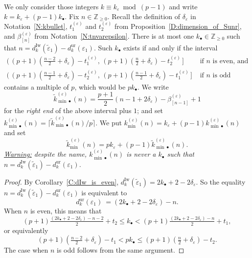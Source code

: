 \begin{lemmanotation}
    \label{L:extremal_ks_part3}
    We only consider those integers $k \equiv k_\varepsilon \bmod{(p-1)}$ and write $k=k_\varepsilon+(p-1)k_{\bullet}$. Fix $n\in {\mathbb{Z}}_{ \geq 0}$.
    Recall the definition of $\delta_\varepsilon$ in Notation~\ref{N:kbullet}, $t_1^{(\varepsilon)}$ and $t_2^{(\varepsilon)}$ from Proposition~\ref{D:dimension_of_Sunr}, and $\beta_{[n]}^{(\varepsilon)}$ from Notation~\ref{N:tnvarepsilon}.
    There is at most one $k_\bullet \in {\mathbb{Z}}_{\geq 0}$ such that  $n = d_{k}^{\mathrm{Iw}}(\tilde \varepsilon_1)-d_{k}^{\mathrm{ur}}(\varepsilon_1)$.
    Such $k_\bullet$ exists if and only if the interval
    \begin{align}
    \label{E:condition_on_kmin}
    \big(\,(p+1)( \tfrac {n-2}2 + \delta_\varepsilon)  -t_1^{(\varepsilon)} , \, (p+1)( \tfrac n2 + \delta_\varepsilon)  -t_2^{(\varepsilon)}\, \big]& \textrm{ if }n \textrm{ is even, and}
    \\
    \nonumber \big(\,(p+1)( \tfrac {n-1}2 + \delta_\varepsilon)  -t_2^{(\varepsilon)} , \, (p+1)( \tfrac {n-1}2 + \delta_\varepsilon)  -t_1^{(\varepsilon)}\, \big] &\textrm{ if }n \textrm{ is odd}
    \end{align}
    contains a multiple of $p$, which would be $pk_\bullet$. We write $$\tilde k_{{\min}\bullet}^{(\varepsilon)}(n)= \frac{p+1}2(n-1+2\delta_\varepsilon) - \beta_{[n-1]}^{(\varepsilon)}+1$$ for the \emph{right end} of the above interval plus $1$; and set $k_{{\min}\bullet}^{(\varepsilon)}(n) = \lceil \tilde k_{{\min}\bullet}^{(\varepsilon)} (n)/ p\rceil$.
    We put $k_{\min}^{(\varepsilon)}(n) = k_\varepsilon + (p-1)k_{{\min}\bullet}^{(\varepsilon)}(n)$ and set
    $$\tilde k_{{\min}}^{(\varepsilon)}(n)  = pk_\varepsilon + (p-1)\tilde k_{{\min}\bullet}^{(\varepsilon)}(n).
    $$
    \emph{\underline{Warning:} despite the name, $k_{{\min}\bullet}^{(\varepsilon)}(n)$ is never  a $k_\bullet$ such that $n = d_{k}^{\mathrm{Iw}}(\tilde \varepsilon_1) - d_{k}^{\mathrm{ur}}(\varepsilon_1)$.}
\end{lemmanotation}

\begin{proof}
    By Corollary~\ref{C:dIw_is_even}, $d_{k}^{{\mathrm{Iw}}}(\tilde \varepsilon_1) = 2k_\bullet + 2-2\delta_\varepsilon$. So the equality $n = d_{k}^{\mathrm{Iw}}(\tilde \varepsilon_1)-d_{k}^{\mathrm{ur}}(\varepsilon_1)$ is equivalent to
    $$
    d_{k}^{\mathrm{ur}}(\varepsilon_1)\ =  (2k_\bullet+2-2\delta_\varepsilon)-n.
    $$
    When $n$ is even, this means that
    $$(p+1)\tfrac { (2k_\bullet+2-2\delta_\varepsilon)-n-2}2 + t_2 \leq k_\bullet  < (p+1)\tfrac {(2k_\bullet+2-2\delta_\varepsilon)-n}2 + t_1,
    $$
    or equivalently
    $$ (p+1)( \tfrac {n-2}2 + \delta_\varepsilon) -t_1 < pk_\bullet  \leq (p+1)( \tfrac n2 + \delta_\varepsilon)  -t_2.
    $$
    The case when $n$ is odd follows from the same argument.
\end{proof}


